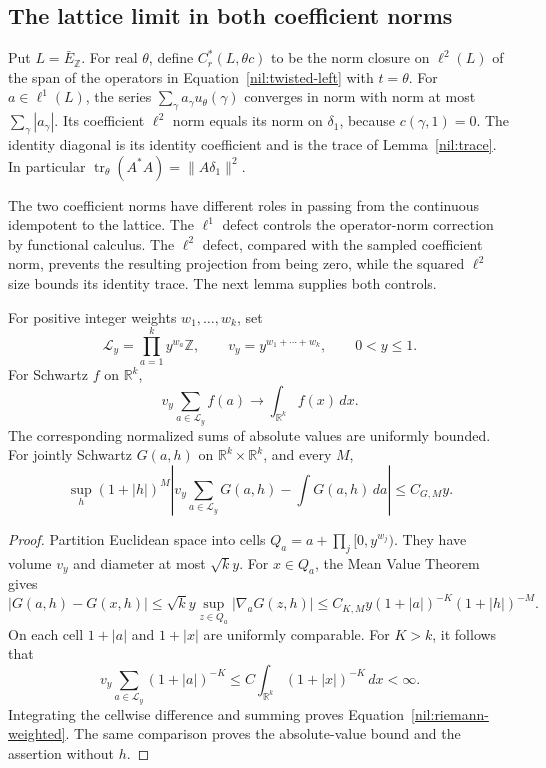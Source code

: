 \subsection{The lattice limit in both coefficient norms}

Put \(L=\bar E_{\mathbb Z}\). For real \(\theta\), define
\(C_r^*(L,\theta c)\) to be the norm closure on \(\ell^2(L)\)
of the span of the operators in Equation~\ref{nil:twisted-left}
with \(t=\theta\). For \(a\in\ell^1(L)\), the series
\(\sum_\gamma a_\gamma u_\theta(\gamma)\) converges in norm
with norm at most \(\sum_\gamma|a_\gamma|\).
Its coefficient \(\ell^2\) norm equals its norm on \(\delta_1\),
because \(c(\gamma,1)=0\).
The identity diagonal is its identity coefficient and is the
trace of Lemma~\ref{nil:trace}. In particular
\(\operatorname{tr}_\theta(A^*A)=\|A\delta_1\|^2\).

The two coefficient norms have different roles in passing from the
continuous idempotent to the lattice. The \(\ell^1\) defect controls
the operator-norm correction by functional calculus. The \(\ell^2\)
defect, compared with the sampled coefficient norm, prevents the
resulting projection from being zero, while the squared \(\ell^2\)
size bounds its identity trace. The next lemma supplies both controls.

\begin{lemma}\label{nil:riemann}
For positive integer weights \(w_1,\ldots,w_k\), set
\[
 \mathcal L_y=\prod_{a=1}^k y^{w_a}\mathbb Z,\qquad
 v_y=y^{w_1+\cdots+w_k},\qquad 0<y\le1.
\]
For Schwartz \(f\) on \(\mathbb R^k\),
\[
 v_y\sum_{a\in\mathcal L_y}f(a)\longrightarrow
                   \int_{\mathbb R^k}f(x)\,dx.
\]
The corresponding normalized sums of absolute values are
uniformly bounded. For jointly Schwartz \(G(a,h)\) on
\(\mathbb R^k\times\mathbb R^k\), and every \(M\),
\begin{equation}\label{nil:riemann-weighted}
 \sup_h(1+|h|)^M
 \left|v_y\sum_{a\in\mathcal L_y}G(a,h)
                    -\int G(a,h)\,da\right|\le C_{G,M}y.
\end{equation}
\end{lemma}

\begin{proof}
Partition Euclidean space into cells
\(Q_a=a+\prod_j[0,y^{w_j})\).
They have volume \(v_y\) and diameter at most \(\sqrt{k}y\).
For \(x\in Q_a\), the Mean Value Theorem gives
\[
 |G(a,h)-G(x,h)|
     \le \sqrt{k}y\sup_{z\in Q_a}|\nabla_aG(z,h)|
     \le C_{K,M}y(1+|a|)^{-K}(1+|h|)^{-M}.
\]
On each cell \(1+|a|\) and \(1+|x|\) are uniformly comparable.
For \(K>k\), it follows that
\[
 v_y\sum_{a\in\mathcal L_y}(1+|a|)^{-K}
     \le C\int_{\mathbb R^k}(1+|x|)^{-K}\,dx<\infty.
\]
Integrating the cellwise difference and summing proves
Equation~\ref{nil:riemann-weighted}. The same comparison
proves the absolute-value bound and the assertion without \(h\).
\end{proof}

